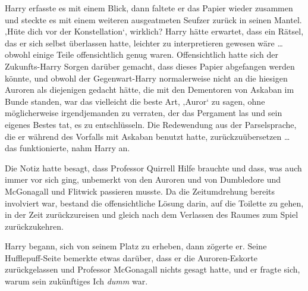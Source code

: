 Harry erfasste es mit einem Blick, dann faltete er das Papier wieder zusammen und steckte es mit einem weiteren ausgeatmeten Seufzer zurück in seinen Mantel.
‚Hüte dich vor der Konstellation‘, wirklich? Harry hätte erwartet, dass ein Rätsel, das er sich selbst überlassen hatte, leichter zu interpretieren gewesen wäre … obwohl einige Teile offensichtlich genug waren. Offensichtlich hatte sich der Zukunfts-Harry Sorgen darüber gemacht, dass dieses Papier abgefangen werden könnte, und obwohl der Gegenwart-Harry normalerweise nicht an die hiesigen Auroren als diejenigen gedacht hätte, die mit den Dementoren von Askaban im Bunde standen, war das vielleicht die beste Art, ‚Auror‘ zu sagen, ohne möglicherweise irgendjemanden zu verraten, der das Pergament las und sein eigenes Bestes tat, es zu entschlüsseln. Die Redewendung aus der Parselsprache, die er während des Vorfalls mit Askaban benutzt hatte, zurückzuübersetzen … das funktionierte, nahm Harry an.

Die Notiz hatte besagt, dass Professor Quirrell Hilfe brauchte und dass, was auch immer vor sich ging, unbemerkt von den Auroren und von Dumbledore und McGonagall und Flitwick passieren musste. Da die Zeitumdrehung bereits involviert war, bestand die offensichtliche Lösung darin, auf die Toilette zu gehen, in der Zeit zurückzureisen und gleich nach dem Verlassen des Raumes zum Spiel zurückzukehren.

Harry begann, sich von seinem Platz zu erheben, dann zögerte er. Seine Hufflepuff-Seite bemerkte etwas darüber, dass er die Auroren-Eskorte zurückgelassen und Professor McGonagall nichts gesagt hatte, und er fragte sich, warum sein zukünftiges Ich \emph{dumm} war.

